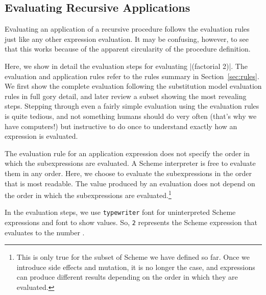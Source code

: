 \begin{schemeregion}
\section{Evaluating Recursive Applications}

Evaluating an application of a recursive procedure follows the evaluation rules just like any other expression evaluation.  It may be confusing, however, to see that this works because of the apparent circularity of the procedure definition.  

Here, we show in detail the evaluation steps for evaluating \scheme|(factorial 2)|.  The evaluation and application rules refer to the rules summary in Section~\ref{sec:rules}.  We first show the complete evaluation following the substitution model evaluation rules in full gory detail, and later review a subset showing the most revealing steps.  Stepping through even a fairly simple evaluation using the evaluation rules is quite tedious, and not something humans should do very often (that's why we have computers!) but instructive to do once to understand exactly how an expression is evaluated.

The evaluation rule for an application expression does not specify the order in which the subexpressions are evaluated.  A Scheme interpreter is free to evaluate them in any order.  Here, we choose to evaluate the subexpressions in the order that is most readable.  The value produced by an evaluation does not depend on the order in which the subexpressions are evaluated.\footnote{This is only true for the subset of Scheme we have defined so far.  Once we introduce side effects and mutation, it is no longer the case, and expressions can produce different results depending on the order in which they are evaluated.}

In the evaluation steps, we use \texttt{typewriter} font for uninterpreted Scheme expressions and  font to show values. So, \texttt{2} represents the Scheme expression that evaluates to the number .

\vspace*{\baselineskip}


\end{schemeregion}
